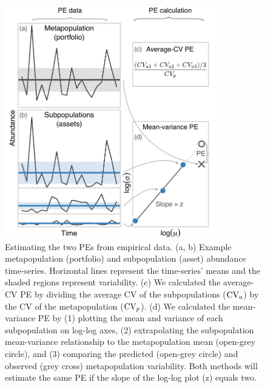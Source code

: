 \begin{figure}[htbp]
  \centering
  \includegraphics[height=4in]{prophets/fig1}
  \caption{
  Estimating the two PEs from empirical data. (a, b) Example
    metapopulation (portfolio) and subpopulation (asset) abundance time-series.
    Horizontal lines represent the time-series' means and the shaded regions
    represent variability. (c) We calculated the average-CV PE by dividing the
    average CV of the subpopulations ($\mathrm{CV}_a$) by the CV of the metapopulation
    ($\mathrm{CV}_p$). (d) We calculated the mean-variance PE by (1) plotting the mean
    and variance of each subpopulation on log-log axes, (2) extrapolating the
    subpopulation mean-variance relationship to the metapopulation mean
    (open-grey circle), and (3) comparing the predicted (open-grey circle) and
    observed (grey cross) metapopulation variability. Both methods will
    estimate the same PE if the slope of the log-log plot (z) equals two.
  }
  \label{fig:didactic}
\end{figure}

